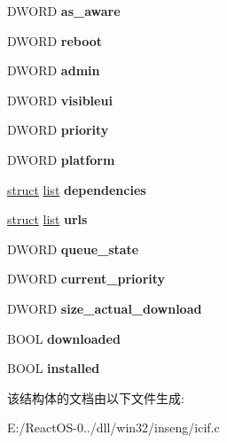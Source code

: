 \begin{DoxyCompactItemize}
D\+W\+O\+RD {\bfseries as\+\_\+aware}
\item 
\mbox{\label{structcifcomponent_a3f8271f8d9a0f521b251109dda62c85e}} 
D\+W\+O\+RD {\bfseries reboot}
\item 
\mbox{\label{structcifcomponent_a2cb5aa9be5ffacb07e4d1ba4ee0c9e6e}} 
D\+W\+O\+RD {\bfseries admin}
\item 
\mbox{\label{structcifcomponent_a2d4240c2aebb5e5f4552db1849d01616}} 
D\+W\+O\+RD {\bfseries visibleui}
\item 
\mbox{\label{structcifcomponent_af2a12afb4e043ffb474a94dbe4230566}} 
D\+W\+O\+RD {\bfseries priority}
\item 
\mbox{\label{structcifcomponent_a58ad598e2838bdc61d0072a835972113}} 
D\+W\+O\+RD {\bfseries platform}
\item 
\mbox{\label{structcifcomponent_af12ae8c0a9f34d3c80e69e1125e85559}} 
\hyperlink{interfacestruct}{struct} \hyperlink{classlist}{list} {\bfseries dependencies}
\item 
\mbox{\label{structcifcomponent_a73838349f70ded0460a4fac8ad455c54}} 
\hyperlink{interfacestruct}{struct} \hyperlink{classlist}{list} {\bfseries urls}
\item 
\mbox{\label{structcifcomponent_a083e57091355f4f1608a3df69d261244}} 
D\+W\+O\+RD {\bfseries queue\+\_\+state}
\item 
\mbox{\label{structcifcomponent_ad124b701939c8ad209afbf438809ecea}} 
D\+W\+O\+RD {\bfseries current\+\_\+priority}
\item 
\mbox{\label{structcifcomponent_aae2a486dce842d73a1de1064a5643a03}} 
D\+W\+O\+RD {\bfseries size\+\_\+actual\+\_\+download}
\item 
\mbox{\label{structcifcomponent_a9ddcd40ee35777ae4c3b7f0e16442895}} 
B\+O\+OL {\bfseries downloaded}
\item 
\mbox{\label{structcifcomponent_a6b829481a1ed9e6b054bcd58048b94d8}} 
B\+O\+OL {\bfseries installed}
\end{DoxyCompactItemize}


该结构体的文档由以下文件生成\+:\begin{DoxyCompactItemize}
\item 
E\+:/\+React\+O\+S-\/0../dll/win32/inseng/icif.\+c\end{DoxyCompactItemize}
